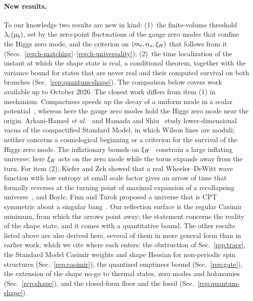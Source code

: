 \paragraph{New results.}
To our knowledge two results are new in kind:
(1)~the finite-volume threshold $\lambda_c(\mu_b)$, set by the zero-point fluctuations of the gauge zero modes that confine the Higgs zero mode, and the criterion on $(m_t,\alpha_s,\xi_H)$ that follows from it (Secs.~\ref{rep:h-matching}--\ref{rep:h-universality});
(2)~the time localization of the instant at which the shape state is real, a conditional theorem, together with the variance bound for states that are never real and their computed survival on both branches (Sec.~\ref{rep:quantum-shape}).
The comparison below covers work available up to October 2026. %
The closest work differs from item (1) in mechanism.
Compactness speeds up the decay of a uniform mode in a scalar potential~\cite{Hassan:2026cmp}, whereas here the gauge zero modes hold the Higgs zero mode near the origin.
Arkani-Hamed \emph{et al.}~\cite{Arkani-Hamed:2007ryu} and Hamada and Shiu~\cite{Hamada:2017yji} study lower-dimensional vacua of the compactified Standard Model, in which Wilson lines are moduli; neither concerns a cosmological beginning or a criterion for the survival of the Higgs zero mode.
The inflationary bounds on $\xi_H$~\cite{Herranen:2014cua,Mantziris:2020rzh,Mantziris:2022fuu} constrain a large inflating universe; here $\xi_H$ acts on the zero mode while the torus expands away from the turn.
For item (2), Kiefer and Zeh showed that a real Wheeler--DeWitt wave function with low entropy at small scale factor gives an arrow of time that formally reverses at the turning point of maximal expansion of a recollapsing universe~\cite{Kiefer:1994gp}, and Boyle, Finn and Turok proposed a universe that is CPT symmetric about a singular bang~\cite{Boyle:2018tzc}.
Our reflection surface is the regular Casimir minimum, from which the arrows point away; the statement concerns the reality of the shape state, and it comes with a quantitative bound.
The other results listed above are also derived here, several of them in more general form than in earlier work, which we cite where each enters: the obstruction of Sec.~\ref{rep:trace}, the Standard Model Casimir weights and shape Hessian for non-periodic spin structures (Sec.~\ref{rep:casimir}), the quantized emptiness bound (Sec.~\ref{rep:gate}), the extension of the shape no-go to thermal states, zero modes and holonomies (Sec.~\ref{rep:shape}), and the closed-form floor and the fossil (Sec.~\ref{rep:quantum-shape}).

